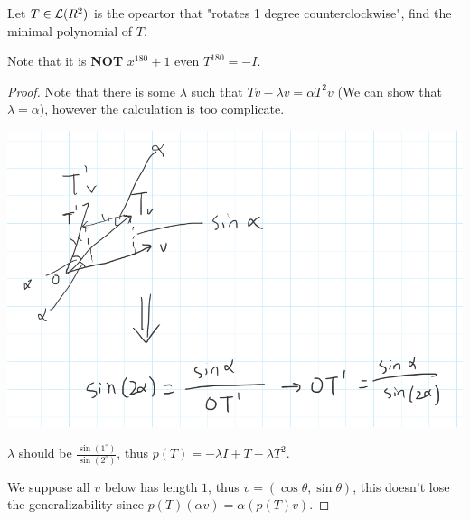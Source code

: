 \documentclass[../main.tex]{subfiles}
\begin{document}
\begin{exercise}
  Let $T \in \mathcal{L}(R^2)$ is the opeartor that "rotates 1 degree counterclockwise",
  find the minimal polynomial of $T$.

  Note that it is \textbf{NOT} $x^{180} + 1$ even $T^{180} = -I$.
\end{exercise}
\begin{proof}
  Note that there is some $\lambda$ such that $Tv - \lambda v = \alpha T^2 v$ (We can show that $\lambda = \alpha$),
  however the calculation is too complicate.

  \includegraphics[scale=0.6]{./resources/E5B-8-resource.png} 

  $\lambda$ should be $\frac{\sin(1^{\circ})}{\sin(2^\circ)}$, thus
  $p(T) = - \lambda I + T - \lambda T^2$.

  We suppose all $v$ below has length $1$, thus $v = (\cos \theta, \sin \theta)$,
  this doesn't lose the generalizability since $p(T)(\alpha v) = \alpha (p(T)v)$.


\end{proof}
\end{document}
